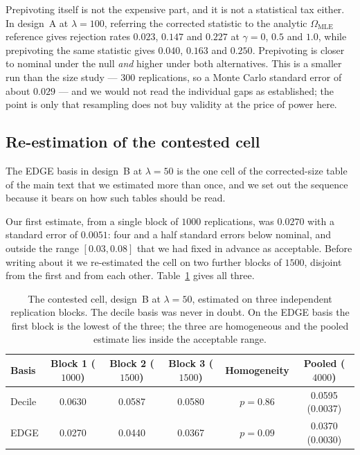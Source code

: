 \documentclass[11pt,a4paper]{article}
\theoremstyle{plain}
\theoremstyle{remark}
\begin{document}
Prepivoting itself is not the expensive part, and it is not a statistical tax either. In
design~A at $\lambda = 100$, referring the corrected statistic to the analytic
$\Omega_{\mathrm{MLE}}$ reference gives rejection rates $0.023$, $0.147$ and $0.227$ at
$\gamma = 0$, $0.5$ and $1.0$, while prepivoting the same statistic gives $0.040$,
$0.163$ and $0.250$. Prepivoting is closer to nominal under the null \emph{and}
higher under both alternatives. This is a smaller run than the size study --- $300$
replications, so a Monte Carlo standard error of about $0.029$ --- and we would not read
the individual gaps as established; the point is only that resampling does not buy
validity at the price of power here.

\subsection{Re-estimation of the contested cell}\label{sec:contested}

The EDGE basis in design~B at $\lambda = 50$ is the one cell of the corrected-size table of the main text
that we estimated more than once, and we set out the sequence because it bears on how
such tables should be read.

Our first estimate, from a single block of $1000$ replications, was $0.0270$ with a
standard error of $0.0051$: four and a half standard errors below nominal, and outside
the range $[0.03, 0.08]$ that we had fixed in advance as acceptable. Before writing about
it we re-estimated the cell on two further blocks of $1500$, disjoint from the first and
from each other. Table~\ref{tab:contested} gives all three.

\begin{table}[htbp]
\centering
\caption{The contested cell, design~B at $\lambda = 50$, estimated on three independent
replication blocks. The decile basis was never in doubt. On the EDGE basis the first
block is the lowest of the three; the three are homogeneous and the pooled estimate lies
inside the acceptable range.}
\label{tab:contested}
\begin{tabular}{lccccc}
\toprule
Basis & Block 1 ($1000$) & Block 2 ($1500$) & Block 3 ($1500$)
& Homogeneity & Pooled ($4000$) \\
\midrule
Decile & 0.0630 & 0.0587 & 0.0580 & $p = 0.86$ & 0.0595 (0.0037) \\
EDGE   & 0.0270 & 0.0440 & 0.0367 & $p = 0.09$ & 0.0370 (0.0030) \\
\bottomrule
\end{tabular}
\end{table}
\end{document}
